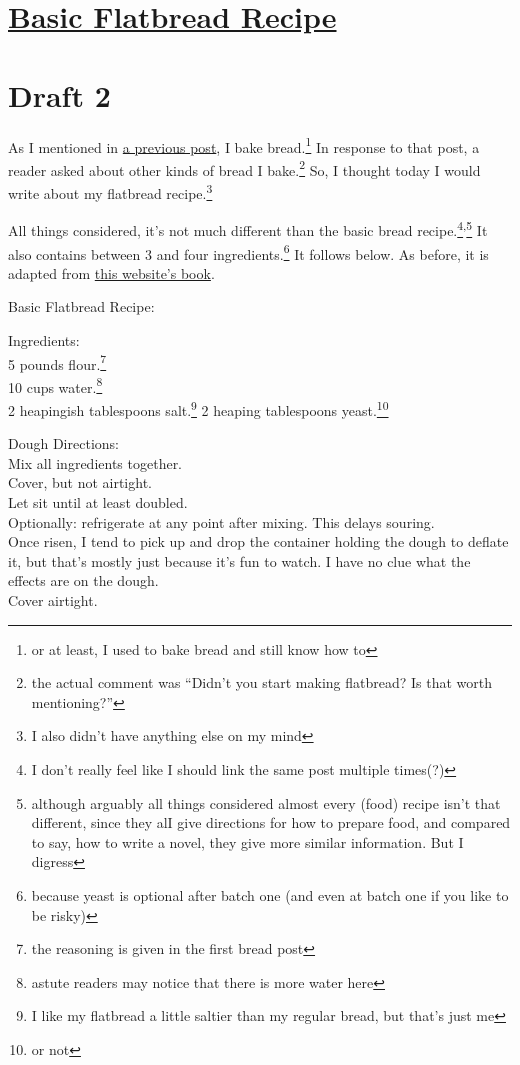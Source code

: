 \documentclass[12pt]{article}[titlepage]
\newcommand{\say}[1]{``#1''}
\newcommand{\1}{\={a}}
\newcommand{\2}{\={e}}
\newcommand{\3}{\={\i}}
\newcommand{\4}{\=o}
\newcommand{\5}{\=u}
\newcommand{\6}{\={A}}
\renewcommand{\,}{\textsuperscript{,}}
\begin{document}
\doublespacing
\section{\href{basic-flatbread-recipe.html}{Basic Flatbread Recipe}}
\section{Draft 2}
As I mentioned in \href{basic-bread-recipe.html}{a previous post}, I bake bread.\footnote{or at least, I used to bake bread and still know how to}
In response to that post, a reader asked about other kinds of bread I bake.\footnote{the actual comment was \say{Didn't you start making flatbread? Is that worth mentioning?}}
So, I thought today I would write about my flatbread recipe.\footnote{I also didn't have anything else on my mind}

All things considered, it's not much different than the basic bread recipe.\footnote{I don't really feel like I should link the same post multiple times(?)}\,\footnote{although arguably all things considered almost every (food) recipe isn't that different, since they alI give directions for how to prepare food, and compared to say, how to write a novel, they give more similar information. But I digress}
It also contains between 3 and four ingredients.\footnote{because yeast is optional after batch one (and even at batch one if you like to be risky)}
It follows below.
As before, it is adapted from \href{https://artisanbreadinfive.com}{this website's book}.

Basic Flatbread Recipe:

Ingredients:\\
5 pounds flour.\footnote{the reasoning is given in the first bread post}\\
10 cups water.\footnote{astute readers may notice that there is more water here}\\
2 heapingish tablespoons salt.\footnote{I like my flatbread a little saltier than my regular bread, but that's just me}
2 heaping tablespoons yeast.\footnote{or not}

Dough Directions:\\
Mix all ingredients together.\\
Cover, but not airtight.\\
Let sit until at least doubled.\\
Optionally: refrigerate at any point after mixing.
This delays souring.\\
Once risen, I tend to pick up and drop the container holding the dough to deflate it, but that's mostly just because it's fun to watch.
I have no clue what the effects are on the dough.\\
Cover airtight.
\end{document}
